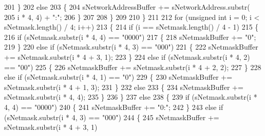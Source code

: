\begin{DoxyCode}
201                         \}
202                         \textcolor{keywordflow}{else}
203                         \{
204                             sNetworkAddressBuffer += sNetworkAddress.substr(
205                                     i * 4, 4) + \textcolor{stringliteral}{":"};
206                         \}
207 
208                     \}
209 
210                 \}
211 
212                 \textcolor{keywordflow}{for} (\textcolor{keywordtype}{unsigned} \textcolor{keywordtype}{int} i = 0; i < sNetmask.length() / 4; i++)
213                 \{
214                     \textcolor{keywordflow}{if} (i == sNetmask.length() / 4 - 1)
215                     \{
216                         \textcolor{keywordflow}{if} (sNetmask.substr(i * 4, 4) == \textcolor{stringliteral}{"0000"})
217                         \{
218                             sNetmaskBuffer += \textcolor{stringliteral}{"0"};
219                         \}
220                         \textcolor{keywordflow}{else} \textcolor{keywordflow}{if} (sNetmask.substr(i * 4, 3) == \textcolor{stringliteral}{"000"})
221                         \{
222                             sNetmaskBuffer += sNetmask.substr(i * 4 + 3, 1);
223                         \}
224                         \textcolor{keywordflow}{else} \textcolor{keywordflow}{if} (sNetmask.substr(i * 4, 2) == \textcolor{stringliteral}{"00"})
225                         \{
226                             sNetmaskBuffer += sNetmask.substr(i * 4 + 2, 2);
227                         \}
228                         \textcolor{keywordflow}{else} \textcolor{keywordflow}{if} (sNetmask.substr(i * 4, 1) == \textcolor{stringliteral}{"0"})
229                         \{
230                             sNetmaskBuffer += sNetmask.substr(i * 4 + 1, 3);
231                         \}
232                         \textcolor{keywordflow}{else}
233                         \{
234                             sNetmaskBuffer += sNetmask.substr(i * 4, 4);
235                         \}
236                     \}
237                     \textcolor{keywordflow}{else}
238                     \{
239                         \textcolor{keywordflow}{if} (sNetmask.substr(i * 4, 4) == \textcolor{stringliteral}{"0000"})
240                         \{
241                             sNetmaskBuffer += \textcolor{stringliteral}{"0:"};
242                         \}
243                         \textcolor{keywordflow}{else} \textcolor{keywordflow}{if} (sNetmask.substr(i * 4, 3) == \textcolor{stringliteral}{"000"})
244                         \{
245                             sNetmaskBuffer += sNetmask.substr(i * 4 + 3, 1)

\end{DoxyCode}
